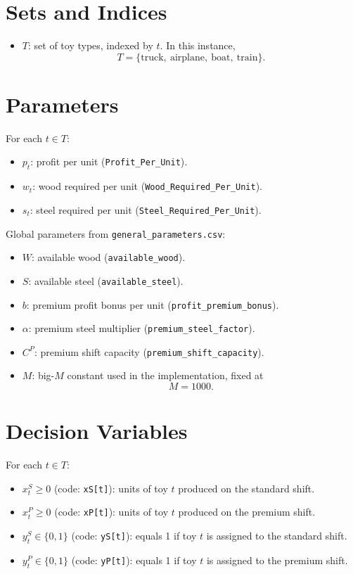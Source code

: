 \section*{Sets and Indices}

\begin{itemize}
    \item $T$: set of toy types, indexed by $t$. In this instance,
    \[
    T=\{\text{truck},\ \text{airplane},\ \text{boat},\ \text{train}\}.
    \]
\end{itemize}

\section*{Parameters}

For each $t \in T$:
\begin{itemize}
    \item $p_t$: profit per unit (\texttt{Profit\_Per\_Unit}).
    \item $w_t$: wood required per unit (\texttt{Wood\_Required\_Per\_Unit}).
    \item $s_t$: steel required per unit (\texttt{Steel\_Required\_Per\_Unit}).
\end{itemize}

Global parameters from \texttt{general\_parameters.csv}:
\begin{itemize}
    \item $W$: available wood (\texttt{available\_wood}).
    \item $S$: available steel (\texttt{available\_steel}).
    \item $b$: premium profit bonus per unit (\texttt{profit\_premium\_bonus}).
    \item $\alpha$: premium steel multiplier (\texttt{premium\_steel\_factor}).
    \item $C^P$: premium shift capacity (\texttt{premium\_shift\_capacity}).
    \item $M$: big-$M$ constant used in the implementation, fixed at
    \[
    M=1000.
    \]
\end{itemize}

\section*{Decision Variables}

For each $t \in T$:
\begin{itemize}
    \item $x^S_t \ge 0$ (code: \texttt{xS[t]}): units of toy $t$ produced on the standard shift.
    \item $x^P_t \ge 0$ (code: \texttt{xP[t]}): units of toy $t$ produced on the premium shift.
    \item $y^S_t \in \{0,1\}$ (code: \texttt{yS[t]}): equals 1 if toy $t$ is assigned to the standard shift.
    \item $y^P_t \in \{0,1\}$ (code: \texttt{yP[t]}): equals 1 if toy $t$ is assigned to the premium shift.
\end{itemize}

